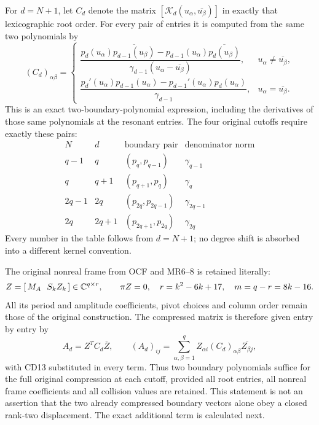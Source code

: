 For \(d=N+1\), let \(C_d\) denote the matrix
\([\mathcal K_d(u_\alpha,\overline{u_\beta})]\) in exactly that
lexicographic root order. For every pair of entries it is computed from
the same two polynomials by
\begin{equation}\label{cdroot:eq:entry-recipe}
 (C_d)_{\alpha\beta}=
 \begin{cases}
 \dfrac{p_d(u_\alpha)\overline{p_{d-1}(u_\beta)}-
 p_{d-1}(u_\alpha)\overline{p_d(u_\beta)}}
 {\gamma_{d-1}(u_\alpha-\overline{u_\beta})},
 &u_\alpha\ne\overline{u_\beta},\\[7pt]
 \dfrac{p_d'(u_\alpha)p_{d-1}(u_\alpha)-
 p_{d-1}'(u_\alpha)p_d(u_\alpha)}{\gamma_{d-1}},
 &u_\alpha=\overline{u_\beta}.
 \end{cases}
 \tag{CD13}
\end{equation}
This is an exact two-boundary-polynomial expression, including the
derivatives of those same polynomials at the resonant entries.
The four original cutoffs require exactly these pairs:
\[
\begin{array}{c|c|c|c}
N&d&\text{boundary pair}&\text{denominator norm}\\\hline
q-1&q&(p_q,p_{q-1})&\gamma_{q-1}\\
q&q+1&(p_{q+1},p_q)&\gamma_q\\
2q-1&2q&(p_{2q},p_{2q-1})&\gamma_{2q-1}\\
2q&2q+1&(p_{2q+1},p_{2q})&\gamma_{2q}
\end{array}
 \tag{CD14}
\]
Every number in the table follows from \(d=N+1\); no degree shift is
absorbed into a different kernel convention.

The original nonreal frame from OCF and MR6--8 is retained literally:
\[
 Z=[\,M_A\ \ S_kZ_k\,]\in\mathbb C^{q\times r},\qquad
 \pi Z=0,\quad r=k^2-6k+17,
 \quad m=q-r=8k-16.
\]
All its period and amplitude coefficients, pivot choices and column
order remain those of the original construction. The compressed matrix
is therefore given entry by entry by
\begin{equation}\label{cdroot:eq:compression-recipe}
 A_d=Z^TC_d\overline Z,
 \qquad
 (A_d)_{ij}=\sum_{\alpha,\beta=1}^q
    Z_{\alpha i}(C_d)_{\alpha\beta}\overline{Z_{\beta j}},
 \tag{CD15}
\end{equation}
with CD13 substituted in every term. Thus two boundary polynomials
suffice for the full original compression at each cutoff, provided all
root entries, all nonreal frame coefficients and all collision values
are retained. This statement is not an assertion that the two already
compressed boundary vectors alone obey a closed rank-two displacement.
The exact additional term is calculated next.

